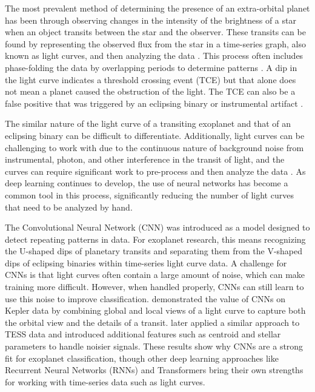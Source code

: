 \documentclass[letterpaper]{article} %
\begin{document}
The most prevalent method of determining the presence of an extra-orbital planet has been through observing changes in the intensity of the brightness of a star when an object transits between the star and the observer. These transits can be found by representing the observed flux from the star in a time-series graph, also known as light curves, and then analyzing the data \cite{morvan2022dontpayattentionnoise}. This process often includes phase-folding the data by overlapping periods to determine patterns \cite{salinas2023distinguishingtransitfalsepositives}. A dip in the light curve indicates a threshold crossing event (TCE) but that alone does not mean a planet caused the obstruction of the light. The TCE can also be a false positive that was triggered by an eclipsing binary or instrumental artifact \cite{salinas2025tessfullframe}. 

The similar nature of the light curve of a transiting exoplanet and that of an eclipsing binary can be difficult to differentiate. Additionally, light curves can be challenging to work with due to the continuous nature of background noise from instrumental, photon, and other interference in the transit of light, and the curves can require significant work to pre-process and then analyze the data \cite{morvan2022dontpayattentionnoise}. As deep learning continues to develop, the use of neural networks has become a common tool in this process, significantly reducing the number of light curves that need to be analyzed by hand.

The Convolutional Neural Network (CNN) was introduced as a model designed to detect repeating patterns in data. For exoplanet research, this means recognizing the U-shaped dips of planetary transits and separating them from the V-shaped dips of eclipsing binaries within time-series light curve data. A challenge for CNNs is that light curves often contain a large amount of noise, which can make training more difficult. However, when handled properly, CNNs can still learn to use this noise to improve classification. \cite{Dattilo2019identifyexoplanetsII} demonstrated the value of CNNs on Kepler data by combining global and local views of a light curve to capture both the orbital view and the details of a transit. \cite{Osborn2019rapidclassificationtesscandidates} later applied a similar approach to TESS data and introduced additional features such as centroid and stellar parameters to handle noisier signals. These results show why CNNs are a strong fit for exoplanet classification, though other deep learning approaches like Recurrent Neural Networks (RNNs) and Transformers bring their own strengths for working with time-series data such as light curves.
\end{document}
